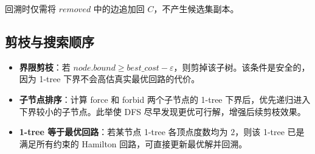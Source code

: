 \documentclass{article}
\begin{document}
回溯时仅需将 $\textit{removed}$ 中的边追加回 $C$，不产生候选集副本。

\subsection{剪枝与搜索顺序}

\begin{itemize}
    \item \textbf{界限剪枝}：若 $node.bound \ge best\_cost - \varepsilon$，则剪掉该子树。该条件是安全的，因为 1-tree 下界不会高估真实最优回路的代价。
    \item \textbf{子节点排序}：计算 force 和 forbid 两个子节点的 1-tree 下界后，优先递归进入下界较小的子节点。此举使 DFS 尽早发现更优可行解，增强后续剪枝效果。
    \item \textbf{1-tree 等于最优回路}：若某节点 1-tree 各顶点度数均为 $2$，则该 1-tree 已是满足所有约束的 Hamilton 回路，可直接更新最优解并回溯。
\end{itemize}
\end{document}
